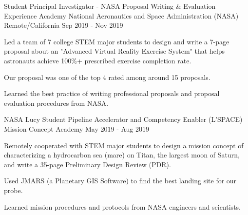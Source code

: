 

\begin{cventries}

  \cventry
    {Student Principal Investigator - NASA Proposal Writing \& Evaluation Experience Academy} %
    {National Aeronautics and Space Administration (NASA)} %
    {Remote/California} %
    {Sep 2019 - Nov 2019} %
    {
	\begin{cvitems} %
      	\item Led a team of 7 college STEM major students to design and write a 7-page proposal about an "Advanced Virtual Reality Exercise System" that helps astronauts achieve 100\%+ prescribed exercise completion rate. 
      	\item Our proposal was one of the top 4 rated among around 15 proposals.
      	\item Learned the best practice of writing professional proposals and proposal evaluation procedures from NASA.
	\end{cvitems}
    }
   
   \cventry
    {NASA Lucy Student Pipeline Accelerator and Competency Enabler (L'SPACE) Mission Concept Academy} %
    {} %
    {} %
    {May 2019 - Aug 2019} %
    {
	\begin{cvitems} %
      	\item Remotely cooperated with STEM major students to design a mission concept of characterizing a hydrocarbon sea (mare) on Titan, the largest moon of Saturn, and write a 35-page Preliminary Design Review (PDR). 
      	\item Used JMARS (a Planetary GIS Software) to find the best landing site for our probe.
      	\item Learned mission procedures and protocols from NASA engineers and scientists.
	\end{cvitems}
    }
    
    

\end{cventries}

